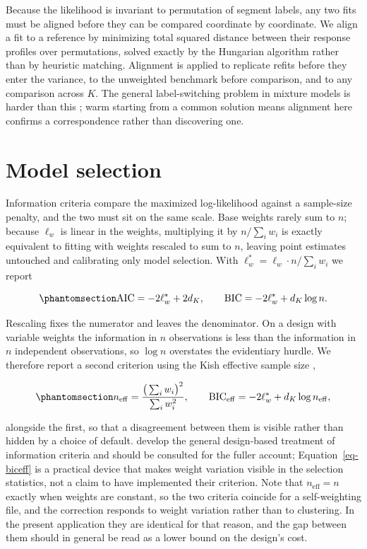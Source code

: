 \documentclass[
  12pt]{article}
\begin{document}
Because the likelihood is invariant to permutation of segment labels,
any two fits must be aligned before they can be compared coordinate by
coordinate. We align a fit to a reference by minimizing total squared
distance between their response profiles over permutations, solved
exactly by the Hungarian algorithm \citep{kuhn1955, hornik2005} rather
than by heuristic matching. Alignment is applied to replicate refits
before they enter the variance, to the unweighted benchmark before
comparison, and to any comparison across \(K\). The general
label-switching problem in mixture models is harder than this
\citep{stephens2000, papastamoulis2014}; warm starting from a common
solution means alignment here confirms a correspondence rather than
discovering one.

\section{Model selection}\label{sec-selection}

Information criteria compare the maximized log-likelihood against a
sample-size penalty, and the two must sit on the same scale. Base
weights rarely sum to \(n\); because \(\ell_w\) is linear in the
weights, multiplying it by \(n / \sum_i w_i\) is exactly equivalent to
fitting with weights rescaled to sum to \(n\), leaving point estimates
untouched and calibrating only model selection. With
\(\ell^{*}_w = \ell_w \cdot n / \sum_i w_i\) we report

\begin{equation}\phantomsection\label{eq-ic}{
\mathrm{AIC} = -2\ell^{*}_w + 2 d_K, \qquad
\mathrm{BIC} = -2\ell^{*}_w + d_K \log n .
}\end{equation}

Rescaling fixes the numerator and leaves the denominator. On a design
with variable weights the information in \(n\) observations is less than
the information in \(n\) independent observations, so \(\log n\)
overstates the evidentiary hurdle. We therefore report a second
criterion using the Kish effective sample size \citep{kish1965},

\begin{equation}\phantomsection\label{eq-biceff}{
n_{\mathrm{eff}} = \frac{\big(\sum_i w_i\big)^2}{\sum_i w_i^2},
\qquad
\mathrm{BIC}_{\mathrm{eff}} = -2\ell^{*}_w + d_K \log n_{\mathrm{eff}} ,
}\end{equation}

alongside the first, so that a disagreement between them is visible
rather than hidden by a choice of default. \citet{lumley2015} develop
the general design-based treatment of information criteria and should be
consulted for the fuller account; Equation~\ref{eq-biceff} is a
practical device that makes weight variation visible in the selection
statistics, not a claim to have implemented their criterion. Note that
\(n_{\mathrm{eff}} = n\) exactly when weights are constant, so the two
criteria coincide for a self-weighting file, and the correction responds
to weight variation rather than to clustering. In the present
application they are identical for that reason, and the gap between them
should in general be read as a lower bound on the design's cost.
\end{document}
